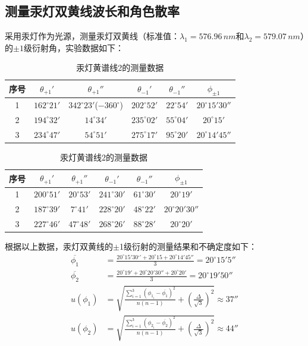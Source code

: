 \documentclass[12pt]{article}
\begin{document}
\subsection{测量汞灯双黄线波长和角色散率}
\vspace{0.2cm}
\quad 采用汞灯作为光源，测量汞灯双黄线（标准值：$\lambda_1=576.96\,nm$和$\lambda_2=579.07\,nm$）的$\pm1$级衍射角，实验数据如下：\\
\begin{table}[H]
    \centering
    \begin{tabular}{cccccc}
        序号 & $\theta_{+1}'$     & $\theta_{+1}''$     & $\theta_{-1}'$      & $\theta_{-1}''$     & $\phi_{\pm 1} $                  \\ \hline
        1  & $162^{\circ}21'$ & $342^{\circ}23'$($-360^{\circ}$) & $202^{\circ}52'$ & $22^{\circ}54'$ & $20^{\circ}15'30''$     \\
        2  & $194^{\circ}32'$ & $14^{\circ}34'$ & $235^{\circ}02'$ & $55^{\circ}04'$ & $20^{\circ}15'$     \\
        3  & $234^{\circ}47'$ & $54^{\circ}51'$ & $275^{\circ}17'$ & $95^{\circ}20'$ & $20^{\circ}14'45''$
        \end{tabular}
    \caption{汞灯黄谱线1的测量数据}
    \vspace{0.2cm}
    \begin{tabular}{cccccc}
        序号 & $\theta_{+1}'$     & $\theta_{+1}''$     & $\theta_{-1}'$      & $\theta_{-1}''$     & $\phi_{\pm 1} $                  \\ \hline
        1  & $200^{\circ}51'$ & $20^{\circ}53'$ & $241^{\circ}30'$ & $61^{\circ}30'$ & $20^{\circ}19'$     \\
        2  & $187^{\circ}39'$ & $7^{\circ}41'$ & $228^{\circ}20'$ & $48^{\circ}22'$ & $20^{\circ}20'30''$     \\
        3  & $227^{\circ}46'$ & $47^{\circ}48'$ & $268^{\circ}26'$ & $88^{\circ}28'$ & $20^{\circ}20'$
        \end{tabular}
    \caption{汞灯黄谱线2的测量数据}
\end{table}
根据以上数据，汞灯双黄线的$\pm$1级衍射的测量结果和不确定度如下：\\
\begin{equation*}
    \begin{aligned}
        \overline{\phi_{1}} &= \frac{20^{\circ}15'30‘’ + 20^{\circ}15 + 20^{\circ}14'45''}{3} = 20^{\circ}15'5'' \\
        \overline{\phi_{2}} &= \frac{20^{\circ}19' + 20^{\circ}20'30'' + 20^{\circ}20'}{3} = 20^{\circ}19'50'' \\
        u(\phi_{1}) &= \sqrt{\frac{\sum_{i=1}^3(\phi_{1_i}-\overline{\phi_{1}})^2}{n(n-1)}+(\frac{\Delta}{\sqrt{3}})^2} \approx 37'' \\
        u(\phi_{2}) &= \sqrt{\frac{\sum_{i=1}^3(\phi_{2_i}-\overline{\phi_{2}})^2}{n(n-1)}+(\frac{\Delta}{\sqrt{3}})^2} \approx 44''
    \end{aligned}
\end{equation*}
\end{document}
